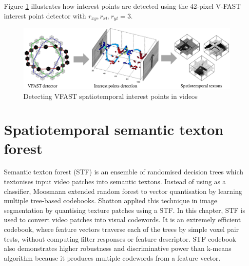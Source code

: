 Figure \ref{fig/act/fastest} illustrates how interest points are detected using the 42-pixel V-FAST interest point detector with $r_{xy},r_{xt},r_{yt} = 3$. 

\begin{figure}[ht]
	\centering
	\includegraphics[width=1\linewidth]{fig/act/fig2_new.pdf}
	\caption{Detecting VFAST spatiotemporal interest points in videos}
	\label{fig/act/fastest}
\end{figure}


\section{Spatiotemporal semantic texton forest}
\label{sec/act/stf}

Semantic texton forest (STF) is an ensemble of randomised decision trees which textonises input video patches into semantic textons. Instead of using as a classifier, Moosmann \etal \cite{Moosmann2007} extended random forest to vector quantisation by learning multiple tree-based codebooks. Shotton \etal \cite{Shotton2008} applied this technique in image segmentation by quantising texture patches using a STF. In this chapter, STF is used to convert video patches into visual codewords.  
It is an extremely efficient codebook, where feature vectors traverse each of the trees by simple voxel pair tests, without computing filter responses or feature descriptor. STF codebook also demonstrates higher robustness and discriminative power than k-means algorithm because it produces multiple codewords from a feature vector. 

